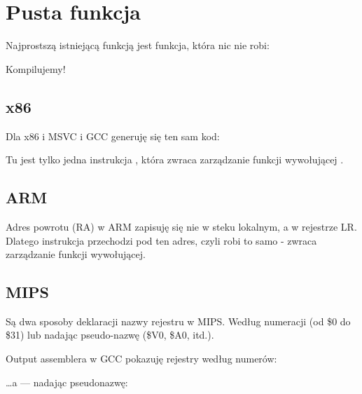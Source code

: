\section{Pusta funkcja}
\label{empty_func}

Najprostszą istniejącą funkcją jest funkcja, która nic nie robi:



Kompilujemy!

\subsection{x86}

Dla x86 i MSVC i GCC generuję się ten sam kod:



Tu jest tylko jedna instrukcja \RET, która zwraca zarządzanie funkcji wywołującej .

\subsection{ARM}



Adres powrotu (\ac{RA}) w ARM zapisuję się nie w steku lokalnym, a w rejestrze \ac{LR}.
Dlatego instrukcja  przechodzi pod ten adres, czyli robi to samo - zwraca zarządzanie funkcji wywołującej.

\subsection{MIPS}

Są dwa sposoby deklaracji nazwy rejestru w MIPS. Według numeracji (od \$0 do \$31) lub nadając pseudo-nazwę (\$V0, \$A0, itd.).

Output assemblera w GCC pokazuję rejestry według numerów:



\dots a \IDA --- nadając pseudonazwę:



